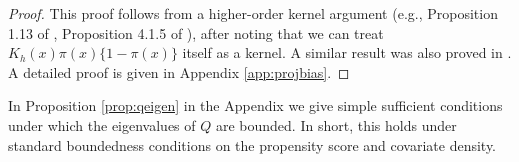 \documentclass[11pt,twoside]{article}
\theoremstyle{definition}
\theoremstyle{remark}
\begin{document}
\bigskip

\begin{proof}
This proof follows from a higher-order kernel argument (e.g., Proposition 1.13 of \citet{tsybakov2009introduction}, Proposition 4.1.5 of \citet{gine2021mathematical}), after noting that we can treat $K_h(x)\pi(x)\{1-\pi(x)\}$ itself as a kernel. A similar result was also proved in \citet{kennedy2023towards}. A detailed proof is given in Appendix \ref{app:projbias}. 
\end{proof}

\bigskip

In Proposition \ref{prop:qeigen} in the Appendix we give simple sufficient conditions under which the eigenvalues of $Q$ are bounded. In short, this holds under standard boundedness conditions on the propensity score and covariate density. \\
\end{document}
